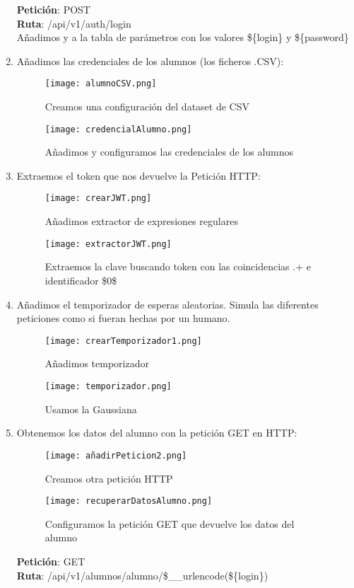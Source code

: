 \begin{enumerate}
	\textbf{Petición}: POST \\
	\textbf{Ruta}: /api/v1/auth/login \\
	Añadimos  y  a la tabla de parámetros con los valores \$\{login\} y  \$\{password\}
	
	\item Añadimos las credenciales de los alumnos (los ficheros .CSV):
	\begin{figure}[H]
		\centering
		\texttt{[image: alumnoCSV.png]}
		\caption{Creamos una configuración del dataset de CSV}
	\end{figure}
	\begin{figure}[H]
		\centering
		\texttt{[image: credencialAlumno.png]}
		\caption{Añadimos y configuramos las credenciales de los alumnos}
	\end{figure}
	\item Extraemos el token que nos devuelve la Petición HTTP:
	\begin{figure}[H]
		\centering
		\texttt{[image: crearJWT.png]}
		\caption{Añadimos extractor de expresiones regulares}
	\end{figure}
	\begin{figure}[H]
		\centering
		\texttt{[image: extractorJWT.png]}
		\caption{Extraemos la clave buscando token con las coincidencias .+ e identificador \$0\$}
	\end{figure}
	
	\item Añadimos el temporizador de esperas aleatorias. Simula las diferentes peticiones como si fueran hechas por un humano.
	\begin{figure}[H]
		\centering
		\texttt{[image: crearTemporizador1.png]}
		\caption{Añadimos temporizador}
	\end{figure}
	\begin{figure}[H]
		\centering
		\texttt{[image: temporizador.png]}
		\caption{Usamos la Gaussiana}
	\end{figure}

	\item Obtenemos los datos del alumno con la petición GET en HTTP:
	\begin{figure}[H]
		\centering
		\texttt{[image: añadirPeticion2.png]}
		\caption{Creamos otra petición HTTP}
	\end{figure}

	\begin{figure}[H]
		\centering
		\texttt{[image: recuperarDatosAlumno.png]}
		\caption{Configuramos la petición GET que devuelve los datos del alumno}
	\end{figure}
	\textbf{Petición}: GET \\
	\textbf{Ruta}: /api/v1/alumnos/alumno/\${\_\_urlencode(\$\{login\})}


\end{enumerate}
